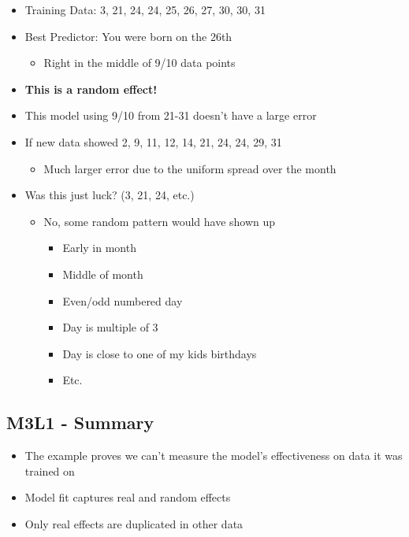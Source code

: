 \documentclass[
]{book}
\providecommand{\tightlist}{%
  \setlength{\itemsep}{0pt}\setlength{\parskip}{0pt}}
\begin{document}
\begin{itemize}
\tightlist
\item
  Training Data: 3, 21, 24, 24, 25, 26, 27, 30, 30, 31
\item
  Best Predictor: You were born on the 26th

  \begin{itemize}
  \tightlist
  \item
    Right in the middle of 9/10 data points
  \end{itemize}
\item
  \textbf{This is a random effect!}
\item
  This model using 9/10 from 21-31 doesn't have a large error
\item
  If new data showed 2, 9, 11, 12, 14, 21, 24, 24, 29, 31

  \begin{itemize}
  \tightlist
  \item
    Much larger error due to the uniform spread over the month
  \end{itemize}
\item
  Was this just luck? (3, 21, 24, etc.)

  \begin{itemize}
  \tightlist
  \item
    No, some random pattern would have shown up

    \begin{itemize}
    \tightlist
    \item
      Early in month
    \item
      Middle of month
    \item
      Even/odd numbered day
    \item
      Day is multiple of 3
    \item
      Day is close to one of my kids birthdays
    \item
      Etc.
    \end{itemize}
  \end{itemize}
\end{itemize}

\subsection{M3L1 - Summary}\label{m3l1---summary}

\begin{itemize}
\tightlist
\item
  The example proves we can't measure the model's effectiveness on data it was trained on
\item
  Model fit captures real and random effects
\item
  Only real effects are duplicated in other data
\end{itemize}
\end{document}
